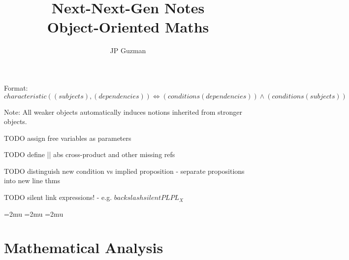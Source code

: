 \documentclass[a4paper]{article}
\title{Next-Next-Gen Notes \\
\large Object-Oriented Maths}
\author{JP Guzman}
\begin{document}
\maketitle
\allowdisplaybreaks

Format: $characteristic((subjects), (dependencies)) \iff (conditions(dependencies)) \land (conditions(subjects))$

Note: All weaker objects automatically induces notions inherited from stronger objects.

TODO assign free variables as parameters

TODO define || abs  cross-product and other missing refs

TODO distinguish new condition vs implied proposition
- separate propositions into new line thms

TODO silent link expressions!
- e.g. $backslash silentPL{PL_X}$

\thinmuskip=2mu %
\medmuskip=2mu %
\thickmuskip=2mu %
\setlength{\belowdisplayskip}{0pt} \setlength{\belowdisplayshortskip}{0pt}
\setlength{\abovedisplayskip}{0pt} \setlength{\abovedisplayshortskip}{0pt}

\section{Mathematical Analysis}
\end{document}
